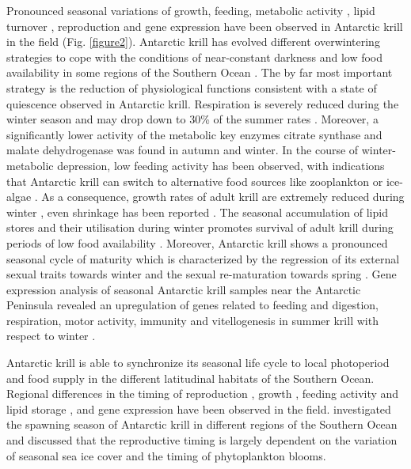Pronounced seasonal variations of growth, feeding, metabolic activity
\citep{meyer_seasonal_2010}, lipid turnover \citep{ericson_seasonal_2018,
hellessey_seasonal_2018}, reproduction \citep{siegel_krill_2012} and gene
expression \citep{seear_seasonal_2012} have been observed in Antarctic krill in
the field (Fig. \ref{figure2}). Antarctic krill has evolved different
overwintering strategies to cope with the conditions of near-constant darkness
and low food availability in some regions of the Southern Ocean
\citep{meyer_performance_2012}. The by far most important strategy is the
reduction of physiological functions consistent with a state of quiescence
observed in Antarctic krill. Respiration is severely reduced during the winter
season and may drop down to 30\% of the summer rates
\citep{meyer_seasonal_2010, quetin_behavioral_1991}. Moreover, a significantly
lower activity of the metabolic key enzymes citrate synthase
\citep{cullen_seasonal_2003, meyer_feeding_2002} and malate dehydrogenase
\citep{meyer_seasonal_2010, pape_melatonin_2008} was found in autumn and
winter. In the course of winter-metabolic depression, low feeding activity has
been observed, with indications that Antarctic krill can switch to alternative
food sources like zooplankton or ice-algae \citep{atkinson_feeding_2002,
meyer_seasonal_2010}. As a consequence, growth rates of adult krill are
extremely reduced
during winter \citep{meyer_seasonal_2010}, even shrinkage has been reported
\citep{quetin_behavioral_1991}. The seasonal accumulation of lipid stores and
their utilisation during winter promotes survival of adult krill during periods
of low food availability \citep{falkowski_global_2000, hagen_lipids_2000,
hagen_lipid_2001, meyer_seasonal_2010, quetin_behavioral_1991}. Moreover,
Antarctic krill shows a pronounced seasonal cycle of maturity which is
characterized by the regression of its external sexual traits towards winter
and the sexual re-maturation towards spring \citep{kawaguchi_male_2007}. Gene
expression analysis of seasonal Antarctic krill samples near the Antarctic
Peninsula revealed an upregulation of genes related to feeding and digestion,
respiration, motor activity, immunity and vitellogenesis in summer krill with
respect to winter \citep{seear_seasonal_2012}.



Antarctic krill is able to synchronize its seasonal life cycle to local
photoperiod and food supply in the different latitudinal habitats of the
Southern Ocean. Regional differences in the timing of reproduction \citep{spiridonov_spatial_1995}, growth \citep{kawaguchi_fishing_2006}, feeding activity and lipid storage \citep{schmidt_feeding_2014}, and gene expression \citep{seear_seasonal_2012} have been
observed in the field. \citet{spiridonov_spatial_1995} investigated the spawning season of
Antarctic krill in different regions of the Southern Ocean and discussed that
the reproductive timing is largely dependent on the variation of  seasonal sea
ice cover and the timing of phytoplankton blooms. 

